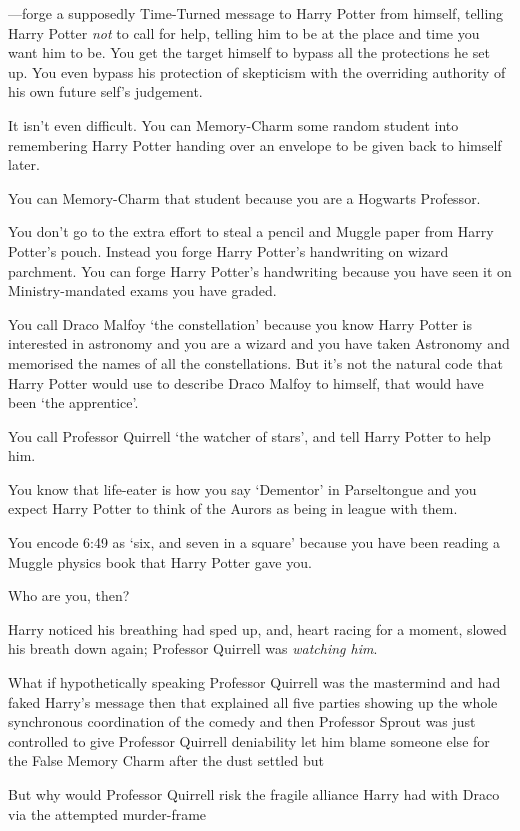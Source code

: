 —forge a supposedly Time-Turned message to Harry Potter from himself, telling Harry Potter \emph{not} to call for help, telling him to be at the place and time you want him to be. You get the target himself to bypass all the protections he set up. You even bypass his protection of skepticism with the overriding authority of his own future self’s judgement.

It isn’t even difficult. You can Memory-Charm some random student into remembering Harry Potter handing over an envelope to be given back to himself later.

You can Memory-Charm that student because you are a Hogwarts Professor.

You don’t go to the extra effort to steal a pencil and Muggle paper from Harry Potter’s pouch. Instead you forge Harry Potter’s handwriting on wizard parchment. You can forge Harry Potter’s handwriting because you have seen it on Ministry-mandated exams you have graded.

You call Draco Malfoy ‘the constellation’ because you know Harry Potter is interested in astronomy and you are a wizard and you have taken Astronomy and memorised the names of all the constellations. But it’s not the natural code that Harry Potter would use to describe Draco Malfoy to himself, that would have been ‘the apprentice’.

You call Professor Quirrell ‘the watcher of stars’, and tell Harry Potter to help him.

You know that life-eater is how you say ‘Dementor’ in Parseltongue and you expect Harry Potter to think of the Aurors as being in league with them.

You encode 6:49 as ‘six, and seven in a square’ because you have been reading a Muggle physics book that Harry Potter gave you.

Who are you, then?

Harry noticed his breathing had sped up, and, heart racing for a moment, slowed his breath down again; Professor Quirrell was \emph{watching him}.

What if hypothetically speaking Professor Quirrell was the mastermind and had faked Harry’s message then that explained all five parties showing up the whole synchronous coordination of the comedy and then Professor Sprout was just controlled to give Professor Quirrell deniability let him blame someone else for the False Memory Charm after the dust settled but

But why would Professor Quirrell risk the fragile alliance Harry had with Draco via the attempted murder-frame

